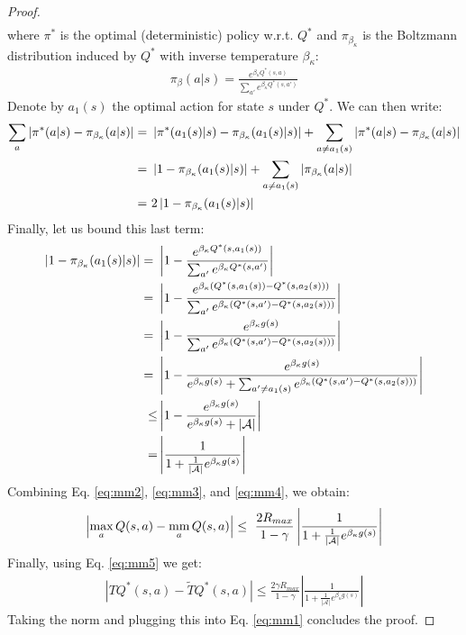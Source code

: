 \documentclass{article}
\newcommand{\mm}{\operatornamewithlimits{mm}}
\newcommand{\wt}[1]{\widetilde{#1}}
\newcommand{\abs}[1]{\left\lvert #1 \right\rvert}
\begin{document}
\begin{proof}
\begin{align}
\end{align}
where $\pi^*$ is the optimal (deterministic) policy w.r.t. $Q^*$ and $\pi_{\beta_{\kappa}}$ is the Boltzmann distribution induced by $Q^*$ with inverse temperature $\beta_{\kappa}$:
\begin{align*}
\pi_{\beta}(a|s) = \frac{e^{\beta_{\kappa} Q^*(s,a)}}{\sum_{a'}e^{\beta_{\kappa} Q^*(s,a')}}
\end{align*}
Denote by $a_1(s)$ the optimal action for state $s$ under $Q^*$. We can then write:
\begin{align} \label{eq:mm3}
\sum_a\abs{\pi^*(a|s) - \pi_{\beta_{\kappa}}(a|s)} =\ & \abs{\pi^*(a_1(s)|s) - \pi_{\beta_{\kappa}}(a_1(s)|s)} + \sum_{a \neq a_1(s)}\abs{\pi^*(a|s) - \pi_{\beta_{\kappa}}(a|s)}\notag\\ =\ & \abs{1 - \pi_{\beta_{\kappa}}(a_1(s)|s)} + \sum_{a \neq a_1(s)}\abs{\pi_{\beta_{\kappa}}(a|s)}\notag\\ =\ & 2\abs{1 - \pi_{\beta_{\kappa}}(a_1(s)|s)}
\end{align}
Finally, let us bound this last term:
\begin{align} \label{eq:mm4}
\abs{1 - \pi_{\beta_{\kappa}}(a_1(s)|s)} =\ & \abs{1 - \frac{e^{\beta_{\kappa} Q^*(s,a_1(s))}}{\sum_{a'}e^{\beta_{\kappa} Q^*(s,a')}}}\notag\\ =\ & \abs{1 - \frac{e^{\beta_{\kappa} \left( Q^*(s,a_1(s)) - Q^*(s,a_2(s)) \right)}}{\sum_{a'}e^{\beta_{\kappa} \left( Q^*(s,a') - Q^*(s,a_2(s))\right)}}}\notag\\ =\ & \abs{1 - \frac{e^{\beta_{\kappa} g(s)}}{\sum_{a'}e^{\beta_{\kappa} \left( Q^*(s,a') - Q^*(s,a_2(s))\right)}}}\notag\\ =\ & \abs{1 - \frac{e^{\beta_{\kappa} g(s)}}{e^{\beta_{\kappa} g(s)} + \sum_{a' \neq a_1(s)}e^{\beta_{\kappa} \left( Q^*(s,a') - Q^*(s,a_2(s))\right)}}}\notag\\ \leq & \abs{1 - \frac{e^{\beta_{\kappa} g(s)}}{e^{\beta_{\kappa} g(s)} + \abs{\mathcal{A}}}}\notag\\ = & \abs{\frac{1}{1 + \frac{1}{\abs{\mathcal{A}}}e^{\beta_{\kappa} g(s)}}}
\end{align}
Combining Eq. \eqref{eq:mm2}, \eqref{eq:mm3}, and \eqref{eq:mm4}, we obtain:
\begin{align*}
\abs{\max_a Q(s,a) - \mm_a Q(s,a)} \leq\ \frac{2 R_{max}}{1-\gamma}\abs{\frac{1}{1 + \frac{1}{\abs{\mathcal{A}}}e^{\beta_{\kappa} g(s)}}}
\end{align*}
Finally, using Eq. \eqref{eq:mm5} we get:
\begin{align*}
\abs{TQ^*(s,a) - \wt{T}Q^*(s,a)} \leq \frac{2\gamma R_{max}}{1-\gamma}\abs{\frac{1}{1 + \frac{1}{\abs{\mathcal{A}}}e^{\beta_{\kappa} g(s)}}}
\end{align*}
Taking the norm and plugging this into Eq. \eqref{eq:mm1} concludes the proof.
\end{proof}
\end{document}

